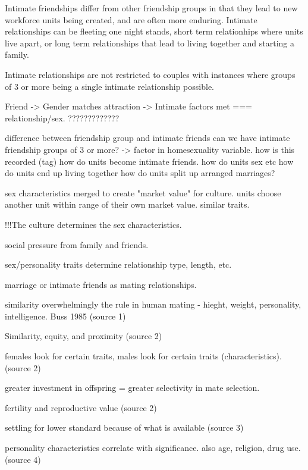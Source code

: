 
Intimate friendships differ from other friendship groups in that they lead to new workforce units being created, and are often more enduring. Intimate relationships can be fleeting one night stands, short term relationhips where units live apart, or long term relationships that lead to living together and starting a family.

Intimate relationships are not restricted to couples with instances where groups of 3 or more being a single intimate relationship possible.   

Friend -> Gender matches attraction -> Intimate factors met === relationship/sex. ?????????????



difference between friendship group and intimate friends
can we have intimate friendship groups of 3 or more? -> factor in homesexuality variable.
how is this recorded (tag)
how do units become intimate friends.
how do units sex etc
how do units end up living together
how do units split up
arranged marriages?

sex characteristics merged to create "market value" for culture.
units choose another unit within range of their own market value.
similar traits.

!!!The culture determines the sex characteristics.

social pressure from family and friends.

sex/personality traits determine relationship type, length, etc.

marriage or intimate friends as mating relationships.

similarity overwhelmingly the rule in human mating - hieght, weight, personality, intelligence. Buss 1985 (source 1)

Similarity, equity, and proximity (source 2)

females look for certain traits, males look for certain traits (characteristics).(source 2)

greater investment in offspring = greater selectivity in mate selection.

fertility and reproductive value (source 2)

settling for lower standard because of what is available (source 3)

personality characteristics correlate with significance. also age, religion, drug use. (source 4) 


